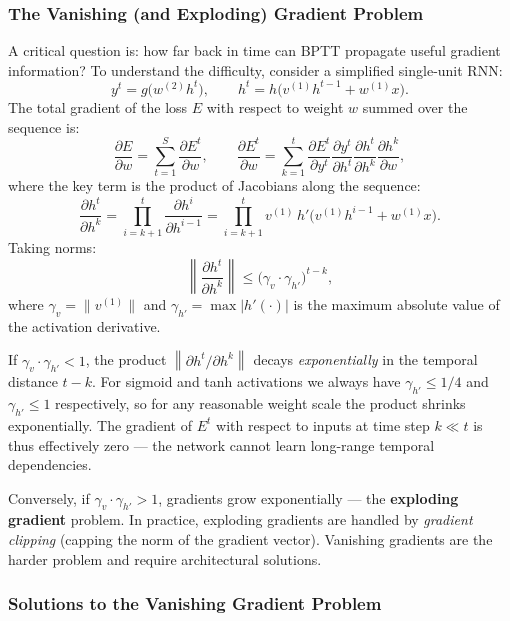 \documentclass[11pt,a4paper]{article}
\newcommand{\term}[1]{\textcolor{DefGreen}{\textbf{#1}}}
\begin{document}
\subsubsection{The Vanishing (and Exploding) Gradient Problem}
\label{sec:vanishing_gradient}

A critical question is: how far back in time can BPTT propagate useful gradient information? To understand the difficulty, consider a simplified single-unit RNN:
\[
  y^t = g\!\bigl(w^{(2)} h^t\bigr), \qquad h^t = h\!\bigl(v^{(1)} h^{t-1} + w^{(1)} x\bigr).
\]
The total gradient of the loss $E$ with respect to weight $w$ summed over the sequence is:
\[
  \frac{\partial E}{\partial w} = \sum_{t=1}^{S}\frac{\partial E^t}{\partial w}, \qquad
  \frac{\partial E^t}{\partial w} = \sum_{k=1}^{t}\frac{\partial E^t}{\partial y^t}\frac{\partial y^t}{\partial h^t}\frac{\partial h^t}{\partial h^k}\frac{\partial h^k}{\partial w},
\]
where the key term is the product of Jacobians along the sequence:
\[
  \frac{\partial h^t}{\partial h^k} = \prod_{i=k+1}^{t}\frac{\partial h^i}{\partial h^{i-1}} = \prod_{i=k+1}^{t} v^{(1)}\, h'\!\bigl(v^{(1)} h^{i-1} + w^{(1)} x\bigr).
\]
Taking norms:
\[
  \left\|\frac{\partial h^t}{\partial h^k}\right\| \leq \bigl(\gamma_v \cdot \gamma_{h'}\bigr)^{t-k},
\]
where $\gamma_v = \|v^{(1)}\|$ and $\gamma_{h'} = \max |h'(\cdot)|$ is the maximum absolute value of the activation derivative.

\begin{warnbox}
If $\gamma_v \cdot \gamma_{h'} < 1$, the product $\left\|\partial h^t/\partial h^k\right\|$ decays \emph{exponentially} in the temporal distance $t - k$. For sigmoid and tanh activations we always have $\gamma_{h'} \leq 1/4$ and $\gamma_{h'} \leq 1$ respectively, so for any reasonable weight scale the product shrinks exponentially. The gradient of $E^t$ with respect to inputs at time step $k \ll t$ is thus effectively zero — the network cannot learn long-range temporal dependencies.

Conversely, if $\gamma_v \cdot \gamma_{h'} > 1$, gradients grow exponentially — the \term{exploding gradient} problem. In practice, exploding gradients are handled by \emph{gradient clipping} (capping the norm of the gradient vector). Vanishing gradients are the harder problem and require architectural solutions.
\end{warnbox}

\subsubsection{Solutions to the Vanishing Gradient Problem}
\end{document}
